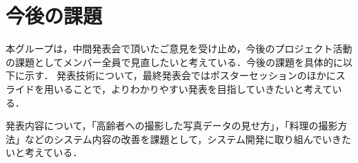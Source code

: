 \documentclass[../report]{subfiles}
\begin{document}
\section{今後の課題}
本グループは，中間発表会で頂いたご意見を受け止め，今後のプロジェクト活動の課題としてメンバー全員で見直したいと考えている．今後の課題を具体的に以下に示す．
発表技術について，最終発表会ではポスターセッションのほかにスライドを用いることで，よりわかりやすい発表を目指していきたいと考えている．

発表内容について，「高齢者への撮影した写真データの見せ方」，「料理の撮影方法」などのシステム内容の改善を課題として，システム開発に取り組んでいきたいと考えている．
\end{document}

